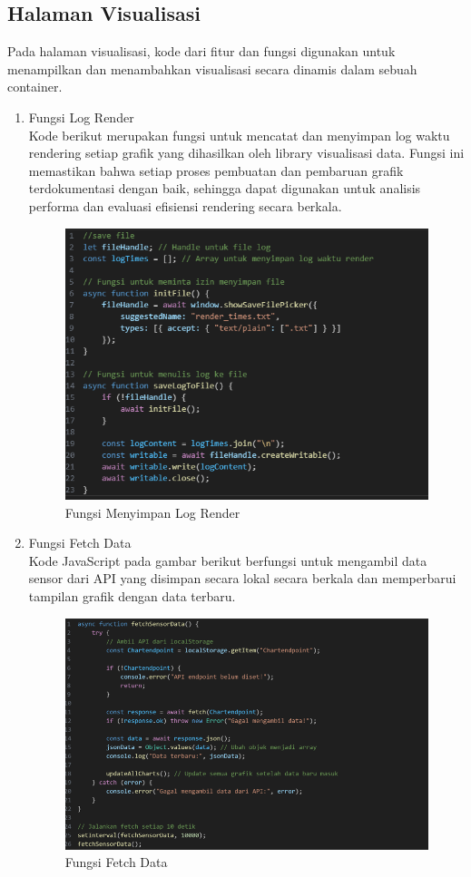 \subsection{Halaman Visualisasi}
Pada halaman visualisasi, kode dari fitur dan fungsi digunakan untuk menampilkan dan menambahkan visualisasi secara dinamis dalam sebuah container. 
\begin{enumerate}[label={\alph*.}]
	\item Fungsi Log Render \\
Kode berikut merupakan fungsi untuk mencatat dan menyimpan log waktu rendering setiap grafik yang dihasilkan oleh library visualisasi data. Fungsi ini memastikan bahwa setiap proses pembuatan dan pembaruan grafik terdokumentasi dengan baik, sehingga dapat digunakan untuk analisis performa dan evaluasi efisiensi rendering secara berkala.
		\begin{figure}[H]
	\centering
	\includegraphics[width=0.8\linewidth]{gambar/Pembahasan/menyimpan log.png}
	\caption{Fungsi Menyimpan Log Render}
	\label{Fungsi Menyimpan Log Render}
	\end{figure} 
	\item Fungsi Fetch Data\\
	Kode JavaScript pada gambar berikut berfungsi untuk mengambil data sensor dari API yang disimpan secara lokal secara berkala dan memperbarui tampilan grafik dengan data terbaru. 
		\begin{figure}[H]
		\centering
		\includegraphics[width=0.8\linewidth]{gambar/Pembahasan/Fungsi Fetch Data.png}
		\caption{Fungsi Fetch Data}
		\label{Fungsi Fetch Data}
	\end{figure} 
	

\end{enumerate}
